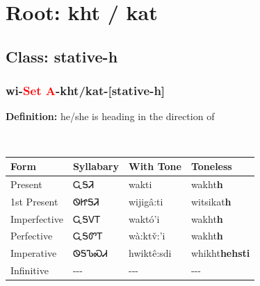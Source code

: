 \needspace{4in}
\section*{Root: kht / kat}
\nopagebreak
{}
\needspace{3in}
\subsection*{Class: stative-h}
\nopagebreak
\needspace{2in}
\subsubsection*{wi{-}\textcolor{Red}{Set A}{-}\textbf{kht/kat}{-}[stative-h]}
\nopagebreak
\textbf{Definition: } he/she is heading in the direction of
\\[0.5em]
\begin{tabularx}{\textwidth}{l X X X}%
\toprule%
\textbf{Form}&\textbf{Syllabary}&\textbf{With Tone}&\textbf{Toneless}\\%
\midrule%
Present&ᏩᎦᏘ&wakti&wakht\textbf{h}\\%
1st Present&ᏫᏥᎦᏘ&wijigâ:ti&witsikat\textbf{h}\\%
Imperfective&ᏩᎦᏙᎢ&waktó’i&wakht\textbf{h}\\%
Perfective&ᏩᎦᏛᎢ&wà:ktv̌:’i&wakht\textbf{h}\\%
Imperative&ᏫᎦᏖᏍᏗ&hwiktê:sdi&whikht\textbf{hehsti}\\%
Infinitive&{-}{-}{-}&{-}{-}{-}&{-}{-}{-}\\%
\bottomrule%
\end{tabularx}
\\[1em]
